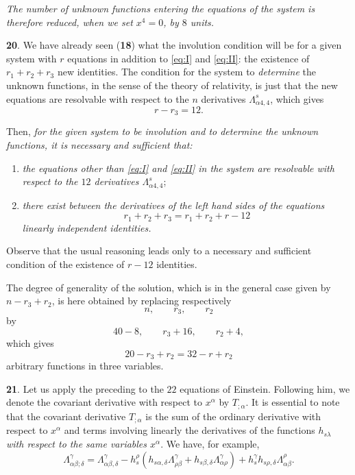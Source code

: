 \documentclass[leqno,11pt]{article}
\theoremstyle{shape1}
\theoremstyle{shape0}
\theoremstyle{shape2}
\theoremstyle{definition}
\begin{document}
\emph{The number of unknown functions entering the equations of the system is therefore reduced, when we set $x^{4}=0$, by $8$ units.}


\vspace{12pt}

\textbf{20}. We have already seen (\textsection\textbf{18})  what the involution condition will be for a given system with $r$ equations in addition to \eqref{eq:I} and \eqref{eq:II}: the existence of $r_{1}+r_{2}+r_{3}$ new identities. The condition for the system to \emph{determine} the unknown functions, in the sense of the theory of relativity, is just that the new equations are resolvable with respect to the $n$ derivatives $\Lambda^{s}_{\alpha4,4}$, which gives
\[
r-r_{3}=12.
\]

Then, \emph{for the given system to be involution and to determine the unknown functions, it is necessary and sufficient that:}
\begin{enumerate}
\item \emph{the equations other than \eqref{eq:I} and \eqref{eq:II} in the system are resolvable with respect to the $12$ derivatives $\Lambda^{s}_{\alpha 4,4}$};
\item \emph{there exist between the derivatives of the left hand sides of the equations}
\[
r_{1}+r_{2}+r_{3}=r_{1}+r_{2}+r-12
\]
\emph{linearly independent identities.}
\end{enumerate}

Observe that the usual reasoning leads only to a necessary and sufficient condition of the existence of $r-12$ identities.

The degree of generality of the solution, which is in the general case given by $n-r_{3}+r_{2}$, is here obtained by replacing respectively
\[
n,\qquad r_{3},\qquad r_{2}
\]
by
\[
40-8,\qquad r_{3}+16,\qquad r_{2}+4,
\]
which gives
\[
20-r_{3}+r_{2}=32-r+r_{2}
\]
arbitrary functions in three variables.

\vspace{12pt}

\textbf{21}. Let us apply the preceding to the $22$ equations of Einstein. Following him, we denote the covariant derivative with respect to $x^{\alpha}$ by $T_{;\alpha}$. It is essential to note that the covariant derivative $T_{;\alpha}$ is the sum of the ordinary derivative with respect to $x^{\alpha}$ and terms involving linearly the derivatives of the functions $h_{s\lambda}$ \emph{with respect to the same variables $x^{\alpha}$}. We have, for example,
\[
\Lambda^{\gamma}_{\alpha\beta;\delta}=\Lambda^{\gamma}_{\alpha\beta,\delta}-h^{\rho}_{s}(h_{s\alpha,\delta}\Lambda^{\gamma}_{\rho\beta}+h_{s\beta,\delta}\Lambda^{\gamma}_{\alpha\rho})+h^{\gamma}_{s}h_{s\rho,\delta}\Lambda^{\rho}_{\alpha\beta}.
\]
\end{document}
